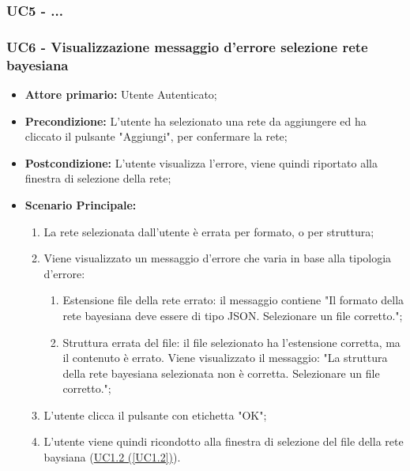 \pagebreak

\subsubsection{UC5 - ...}\label{UC5}

\subsubsection{UC6 - Visualizzazione messaggio d'errore selezione  rete bayesiana}\label{UC6}
\begin{itemize}
\item \textbf{Attore primario:} Utente Autenticato;
\item \textbf{Precondizione:} L'utente ha selezionato una rete da aggiungere ed ha cliccato il pulsante "Aggiungi", per confermare la rete;
\item \textbf{Postcondizione:} L'utente visualizza l'errore, viene quindi riportato alla finestra di selezione della rete;
\item \textbf{Scenario Principale:} 
	\begin{enumerate}
		\item La rete selezionata dall'utente è errata per formato, o per struttura;
		\item Viene visualizzato un messaggio d'errore che varia in base alla tipologia d'errore:
			\begin{enumerate}
				\item Estensione file della rete errato: il messaggio contiene "Il formato della rete bayesiana deve essere di tipo JSON. Selezionare un file corretto.";
				\item Struttura errata del file: il file selezionato ha l'estensione corretta, ma il contenuto è errato. Viene visualizzato il messaggio: "La struttura della rete bayesiana selezionata non è corretta. Selezionare un file corretto.";
			\end{enumerate}
		\item L'utente clicca il pulsante con etichetta "OK";
		\item L'utente viene quindi ricondotto alla finestra di selezione del file della rete baysiana (\hyperref[UC1.2]{UC1.2 (\ref*{UC1.2})}).
	\end{enumerate}
\end{itemize}


